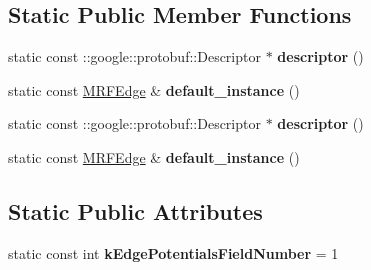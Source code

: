 \subsection*{Static Public Member Functions}
\begin{DoxyCompactItemize}
\item 
\hypertarget{classgraph_1_1MRFEdge_a9697b3be21e480abdeb24c964934d4cb}{
static const ::google::protobuf::Descriptor $\ast$ {\bfseries descriptor} ()}
\label{classgraph_1_1MRFEdge_a9697b3be21e480abdeb24c964934d4cb}

\item 
\hypertarget{classgraph_1_1MRFEdge_a7375f6abdee806d403d0f0c11a8c86d0}{
static const \hyperlink{classgraph_1_1MRFEdge}{MRFEdge} \& {\bfseries default\_\-instance} ()}
\label{classgraph_1_1MRFEdge_a7375f6abdee806d403d0f0c11a8c86d0}

\item 
\hypertarget{classgraph_1_1MRFEdge_a9697b3be21e480abdeb24c964934d4cb}{
static const ::google::protobuf::Descriptor $\ast$ {\bfseries descriptor} ()}
\label{classgraph_1_1MRFEdge_a9697b3be21e480abdeb24c964934d4cb}

\item 
\hypertarget{classgraph_1_1MRFEdge_a7375f6abdee806d403d0f0c11a8c86d0}{
static const \hyperlink{classgraph_1_1MRFEdge}{MRFEdge} \& {\bfseries default\_\-instance} ()}
\label{classgraph_1_1MRFEdge_a7375f6abdee806d403d0f0c11a8c86d0}

\end{DoxyCompactItemize}
\subsection*{Static Public Attributes}
\begin{DoxyCompactItemize}
\item 
\hypertarget{classgraph_1_1MRFEdge_a8cbb86df3eb46154971fc4d59b9656f3}{
static const int {\bfseries kEdgePotentialsFieldNumber} = 1}
\label{classgraph_1_1MRFEdge_a8cbb86df3eb46154971fc4d59b9656f3}

\end{DoxyCompactItemize}
